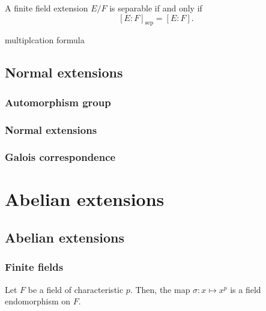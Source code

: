 \documentclass{../note}
\newcommand{\sep}{\mathrm{sep}}
\begin{document}
\begin{thm}
A finite field extension $E/F$ is separable if and only if
\[[E:F]_\sep=[E:F].\]
\end{thm}
\begin{pf}
\end{pf}


multiplcation formula













\chapter{Normal extensions}
\section{Automorphism group}
\section{Normal extensions}
\section{Galois correspondence}





\part{Abelian extensions}

\chapter{Abelian extensions}
\section{Finite fields}
\begin{lem}
Let $F$ be a field of characteristic $p$.
Then, the map $\sigma:x\mapsto x^p$ is a field endomorphism on $F$.
\end{lem}
\end{document}
